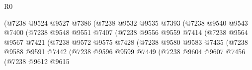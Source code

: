 \begin{lexlean}{R0}
\begin{coremodule}
                                      (@7238
                                        @9524
                                        @9527
                                        @7386
                                        (@7238
                                          @9532
                                          @9535
                                          @7393
                                          (@7238
                                            @9540
                                            @9543
                                            @7400
                                            (@7238
                                              @9548
                                              @9551
                                              @7407
                                              (@7238
                                                @9556
                                                @9559
                                                @7414
                                                (@7238
                                                  @9564
                                                  @9567
                                                  @7421
                                                  (@7238
                                                    @9572
                                                    @9575
                                                    @7428
                                                    (@7238
                                                      @9580
                                                      @9583
                                                      @7435
                                                      (@7238
                                                        @9588
                                                        @9591
                                                        @7442
                                                        (@7238
                                                          @9596
                                                          @9599
                                                          @7449
                                                          (@7238
                                                            @9604
                                                            @9607
                                                            @7456
                                                            (@7238
                                                              @9612
                                                              @9615

\end{coremodule}
\end{lexlean}
